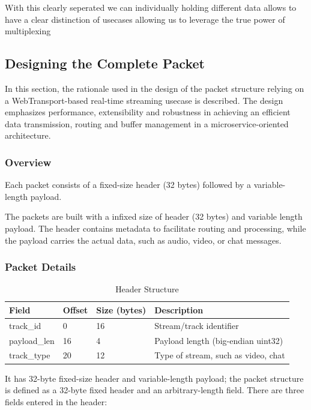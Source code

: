 With this clearly seperated we can individually holding different data allows to have a clear distinction of usecases allowing us to leverage the true power of multiplexing


\subsection{Designing the Complete Packet}

In this section, the rationale used in the design of the packet structure relying on a WebTransport-based real-time streaming usecase is described. The design emphasizes performance, extensibility and robustness in achieving an efficient data transmission, routing and buffer management in a microservice-oriented architecture.

\subsubsection{Overview}
Each packet consists of a fixed-size header (32 bytes) followed by a variable-length payload. 

The packets are built with a infixed size of header (32 bytes) and variable length payload. The header contains metadata to facilitate routing and processing, while the payload carries the actual data, such as audio, video, or chat messages.


\subsubsection{Packet Details}

\begin{table}[h]
\centering
\begin{tabular}{|l|l|l|l|}
\hline
\textbf{Field} & \textbf{Offset} & \textbf{Size (bytes)} & \textbf{Description} \\
\hline
track\_id & 0 & 16 & Stream/track identifier \\
payload\_len & 16 & 4 & Payload length (big-endian uint32) \\
track\_type & 20 & 12 & Type of stream, such as video, chat \\
\hline
\end{tabular}
\caption{Header Structure}
\label{tab:header_structure}
\end{table}

It has 32-byte fixed-size header and variable-length payload; the packet structure is defined as a 32-byte fixed header and an arbitrary-length field. There are three fields entered in the header:

